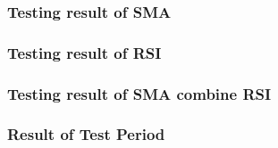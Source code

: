 \documentclass[../Experiment Result.tex]{subfiles}
\begin{document}
\subsubsection{Testing result of SMA}


\subsubsection{Testing result of RSI}


\subsubsection{Testing result of SMA combine RSI}


\subsubsection{Result of Test Period}
\end{document}
